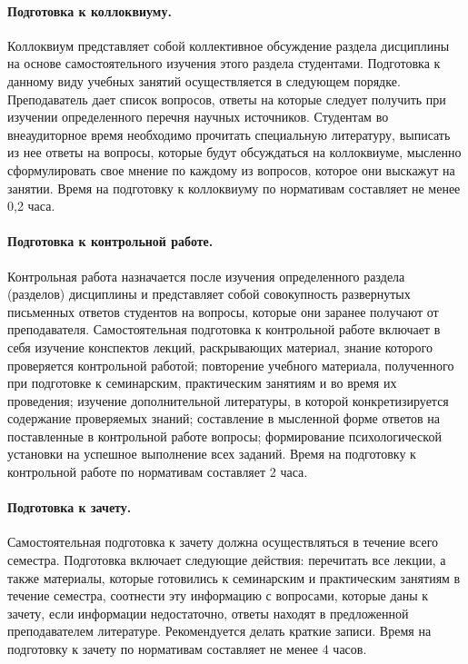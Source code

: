 \documentclass[12pt]{scrartcl}
\begin{document}
\paragraph{Подготовка к коллоквиуму.} Коллоквиум представляет собой коллективное
обсуждение раздела дисциплины на основе самостоятельного изучения этого раздела
студентами. Подготовка к данному виду учебных занятий осуществляется в следующем
порядке. Преподаватель дает список вопросов, ответы на которые следует получить при
изучении определенного перечня научных источников. Студентам во внеаудиторное
время необходимо прочитать специальную литературу, выписать из нее ответы на
вопросы, которые будут обсуждаться на коллоквиуме, мысленно сформулировать свое
мнение по каждому из вопросов, которое они выскажут на занятии. Время на подготовку к
коллоквиуму по нормативам составляет не менее 0,2 часа.

\paragraph{Подготовка к контрольной работе.} Контрольная работа назначается после
изучения определенного раздела (разделов) дисциплины и представляет собой
совокупность развернутых письменных ответов студентов на вопросы, которые они
заранее получают от преподавателя. Самостоятельная подготовка к контрольной работе
включает в себя изучение конспектов лекций, раскрывающих материал, знание
которого проверяется контрольной работой; повторение учебного материала, полученного
при подготовке к семинарским, практическим занятиям и во время их проведения;
изучение дополнительной литературы, в которой конкретизируется содержание
проверяемых знаний; составление в мысленной форме ответов на поставленные в
контрольной работе вопросы; формирование психологической установки на успешное
выполнение всех заданий. Время на подготовку к контрольной работе по нормативам
составляет 2 часа.

\paragraph{Подготовка к зачету.} Самостоятельная подготовка к зачету должна
осуществляться в течение всего семестра. Подготовка включает следующие действия:
перечитать все лекции, а также материалы, которые готовились к семинарским и
практическим занятиям в течение семестра, соотнести эту информацию с вопросами,
которые даны к зачету, если информации недостаточно, ответы находят в предложенной
преподавателем литературе. Рекомендуется делать краткие записи. Время на подготовку к
зачету по нормативам составляет не менее 4 часов.
\end{document}
